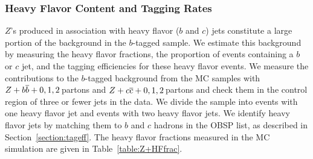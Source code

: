 

\subsubsection{Heavy Flavor Content and Tagging Rates}
$Z$'s produced in association with heavy flavor ($b$ and $c$) jets
constitute a large portion of the background in the $b$-tagged
sample. We estimate this background by measuring the heavy flavor
fractions, \ie the proportion of \Zj events containing a $b$ or $c$
jet, and the tagging efficiencies for these heavy flavor events. We
measure the contributions to the $b$-tagged background from the MC
samples with $Z+{b\overline{b}}+0,1,2$\,partons and $Z+{c\overline{c}}+0,1,2$\,partons
and check them in the control region of three or fewer jets in the
data.
We divide the sample into events with one heavy flavor jet and events
with two heavy flavor jets. We identify heavy flavor jets by matching
them to $b$ and $c$ hadrons in the OBSP list, as described in
Section~\ref{section:tageff}.  The heavy flavor fractions measured in
the MC simulation are given in Table~\ref{table:Z+HFfrac}.

